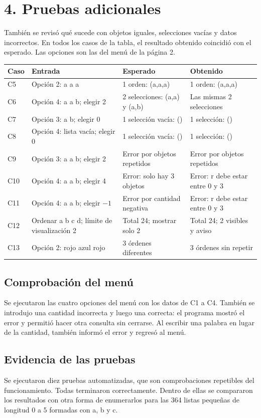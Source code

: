 \documentclass[11pt,a4paper]{article}
\begin{document}
\newpage
\section*{4. Pruebas adicionales}
También se revisó qué sucede con objetos iguales, selecciones vacías y datos
incorrectos. En todos los casos de la tabla, el resultado obtenido coincidió
con el esperado. Las opciones son las del menú de la página 2.

{\small
\renewcommand{\arraystretch}{1.35}
\begin{tabular}{p{0.9cm}p{4.0cm}p{3.8cm}p{3.8cm}}
\hline
\textbf{Caso} & \textbf{Entrada} & \textbf{Esperado} & \textbf{Obtenido} \\
\hline
C5 & Opción 2: a a a & 1 orden: (a,a,a) & 1 orden: (a,a,a) \\
C6 & Opción 4: a a b; elegir 2 & 2 selecciones: (a,a) y (a,b) & Las mismas 2 selecciones \\
C7 & Opción 3: a b; elegir 0 & 1 selección vacía: () & 1 selección: () \\
C8 & Opción 4: lista vacía; elegir 0 & 1 selección vacía: () & 1 selección: () \\
C9 & Opción 3: a a b; elegir 2 & Error por objetos repetidos & Error por objetos repetidos \\
C10 & Opción 4: a a b; elegir 4 & Error: solo hay 3 objetos & Error: r debe estar entre 0 y 3 \\
C11 & Opción 4: a a b; elegir $-1$ & Error por cantidad negativa & Error: r debe estar entre 0 y 3 \\
C12 & Ordenar a b c d; límite de visualización 2 & Total 24; mostrar solo 2 & Total 24; 2 visibles y aviso \\
C13 & Opción 2: rojo azul rojo & 3 órdenes diferentes & 3 órdenes sin repetir \\
\hline
\end{tabular}
}

\subsection*{Comprobación del menú}
Se ejecutaron las cuatro opciones del menú con los datos de C1 a C4. También
se introdujo una cantidad incorrecta y luego una correcta: el programa mostró
el error y permitió hacer otra consulta sin cerrarse. Al escribir una palabra
en lugar de la cantidad, también informó el error y regresó al menú.

\subsection*{Evidencia de las pruebas}
Se ejecutaron diez pruebas automatizadas, que son comprobaciones repetibles
del funcionamiento. Todas terminaron correctamente. Dentro de ellas se
compararon los resultados con otra forma de enumerarlos para las 364 listas
pequeñas de longitud 0 a 5 formadas con a, b y c.
\end{document}
